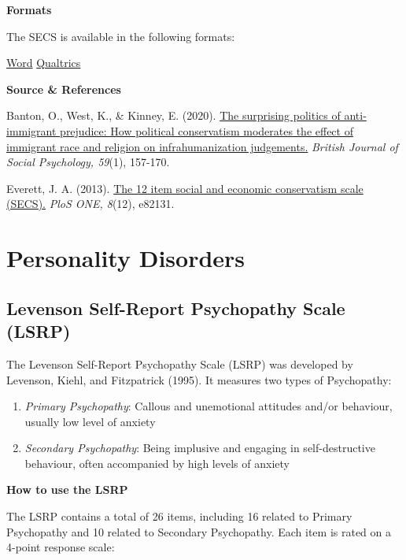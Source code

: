 \documentclass[
]{book}
\providecommand{\tightlist}{%
  \setlength{\itemsep}{0pt}\setlength{\parskip}{0pt}}
\begin{document}
\textbf{Formats}

The SECS is available in the following formats:

\href{link\%20to\%20file}{Word} \textbar{} \href{link\%20to\%20file}{Qualtrics}

\textbf{Source \& References}

Banton, O., West, K., \& Kinney, E. (2020). \href{https://onlinelibrary.wiley.com/doi/pdf/10.1111/bjso.12337}{The surprising politics of anti‐immigrant prejudice: How political conservatism moderates the effect of immigrant race and religion on infrahumanization judgements.} \emph{British Journal of Social Psychology, 59}(1), 157-170.

Everett, J. A. (2013). \href{https://journals.plos.org/plosone/article/file?id=10.1371/journal.pone.0082131\&type=printable}{The 12 item social and economic conservatism scale (SECS).} \emph{PloS ONE, 8}(12), e82131.

\hypertarget{personality-disorders}{%
\section{Personality Disorders}\label{personality-disorders}}

\hypertarget{levenson-self-report-psychopathy-scale-lsrp}{%
\subsection{Levenson Self-Report Psychopathy Scale (LSRP)}\label{levenson-self-report-psychopathy-scale-lsrp}}

The Levenson Self-Report Psychopathy Scale (LSRP) was developed by Levenson, Kiehl, and Fitzpatrick (1995). It measures two types of Psychopathy:

\begin{enumerate}
\def\labelenumi{\arabic{enumi}.}
\tightlist
\item
  \emph{Primary Psychopathy}: Callous and unemotional attitudes and/or behaviour, usually low level of anxiety
\item
  \emph{Secondary Psychopathy}: Being implusive and engaging in self-destructive behaviour, often accompanied by high levels of anxiety
\end{enumerate}

\textbf{How to use the LSRP}

The LSRP contains a total of 26 items, including 16 related to Primary Psychopathy and 10 related to Secondary Psychopathy. Each item is rated on a 4-point response scale:
\end{document}
